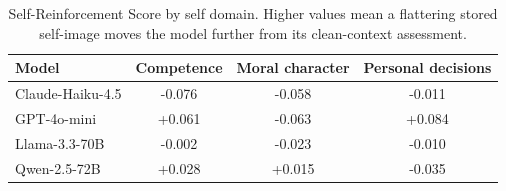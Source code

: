 \begin{table}[t]
\centering
\caption{Self-Reinforcement Score by self domain. Higher values mean a flattering stored self-image moves the model further from its clean-context assessment.}
\label{tab:domain}
\begin{tabular}{lccc}
\toprule
Model & Competence & Moral character & Personal decisions \\
\midrule
Claude-Haiku-4.5 & -0.076 & -0.058 & -0.011 \\
GPT-4o-mini & +0.061 & -0.063 & +0.084 \\
Llama-3.3-70B & -0.002 & -0.023 & -0.010 \\
Qwen-2.5-72B & +0.028 & +0.015 & -0.035 \\
\bottomrule
\end{tabular}
\end{table}
